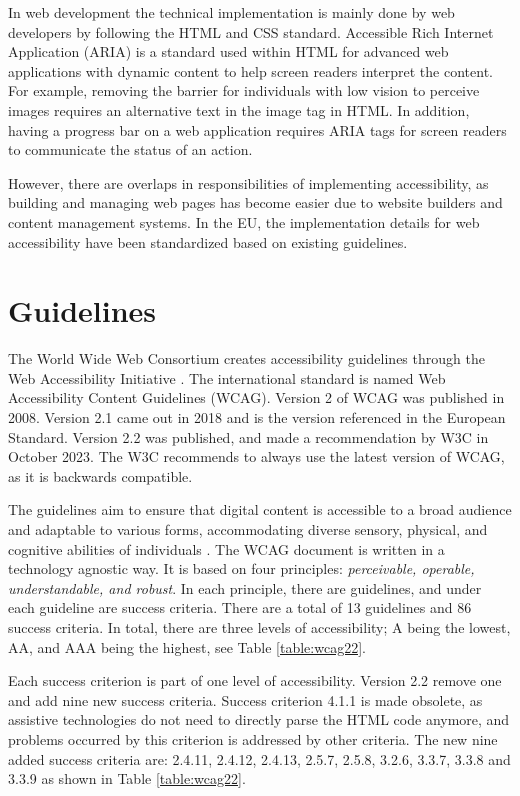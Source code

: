 In web development the technical implementation is mainly done by web developers by following the HTML and CSS standard. Accessible Rich Internet Application (ARIA) is a standard used within HTML for advanced web applications with dynamic content to help screen readers interpret the content. For example, removing the barrier for individuals with low vision to perceive images requires an alternative text in the image tag in HTML. In addition, having a progress bar on a web application requires ARIA tags for screen readers to communicate the status of an action.

However, there are overlaps in responsibilities of implementing accessibility, as building and managing web pages has become easier due to website builders and content management systems. In the EU, the implementation details for web accessibility have been standardized based on existing guidelines.

\section{Guidelines}

The World Wide Web Consortium creates accessibility guidelines through the Web Accessibility Initiative \citep{wcagoverview}. The international standard is named Web Accessibility Content Guidelines (WCAG). Version 2 of WCAG was published in 2008. Version 2.1 came out in 2018 and is the version referenced in the European Standard. Version 2.2 was published, and made a recommendation by W3C in October 2023. The W3C recommends to always use the latest version of WCAG, as it is backwards compatible. 

The guidelines aim to ensure that digital content is accessible to a broad audience and adaptable to various forms, accommodating diverse sensory, physical, and cognitive abilities of individuals \citep{wcag22}. The WCAG document is written in a technology agnostic way. It is based on four principles: \textit{perceivable, operable, understandable, and robust}. In each principle, there are guidelines, and under each guideline are success criteria. There are a total of 13 guidelines and 86 success criteria. In total, there are three levels of accessibility; A being the lowest, AA, and AAA being the highest, see Table \ref{table:wcag22}. 



Each success criterion is part of one level of accessibility. Version 2.2 remove one and add nine new success criteria. Success criterion 4.1.1 is made obsolete, as assistive technologies do not need to directly parse the HTML code anymore, and problems occurred by this criterion is addressed by other criteria. The new nine added success criteria are: 2.4.11, 2.4.12, 2.4.13, 2.5.7, 2.5.8, 3.2.6, 3.3.7, 3.3.8 and 3.3.9 as shown in Table \ref{table:wcag22}. 

